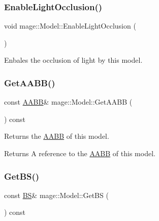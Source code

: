 \subsubsection{\texorpdfstring{Enable\+Light\+Occlusion()}{EnableLightOcclusion()}}
{\footnotesize\ttfamily void mage\+::\+Model\+::\+Enable\+Light\+Occlusion (\begin{DoxyParamCaption}{ }\end{DoxyParamCaption})\hspace{0.3cm}{\ttfamily [noexcept]}}

Enbales the occlusion of light by this model. \hypertarget{classmage_1_1_model_a07af22d1e72ffde3ad33b709a8d5c7f4}{}\label{classmage_1_1_model_a07af22d1e72ffde3ad33b709a8d5c7f4} 
\subsubsection{\texorpdfstring{Get\+A\+A\+B\+B()}{GetAABB()}}
{\footnotesize\ttfamily const \hyperlink{structmage_1_1_a_a_b_b}{A\+A\+BB}\& mage\+::\+Model\+::\+Get\+A\+A\+BB (\begin{DoxyParamCaption}{ }\end{DoxyParamCaption}) const\hspace{0.3cm}{\ttfamily [noexcept]}}

Returns the \hyperlink{structmage_1_1_a_a_b_b}{A\+A\+BB} of this model.

\begin{DoxyReturn}{Returns}
A reference to the \hyperlink{structmage_1_1_a_a_b_b}{A\+A\+BB} of this model. 
\end{DoxyReturn}
\hypertarget{classmage_1_1_model_a7d99f18fd9cd6902795f77995b87bea2}{}\label{classmage_1_1_model_a7d99f18fd9cd6902795f77995b87bea2} 
\subsubsection{\texorpdfstring{Get\+B\+S()}{GetBS()}}
{\footnotesize\ttfamily const \hyperlink{structmage_1_1_b_s}{BS}\& mage\+::\+Model\+::\+Get\+BS (\begin{DoxyParamCaption}{ }\end{DoxyParamCaption}) const\hspace{0.3cm}{\ttfamily [noexcept]}}

